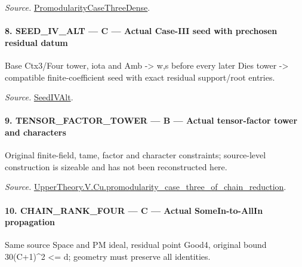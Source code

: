 \documentclass[11pt,a4paper]{article}
\numberwithin{equation}{section}
\theoremstyle{remark}\newtheorem{remark}[theorem]{Remark}
\begin{document}
\emph{Source.} \href{https://github.com/CocoSgt/riemann-hypothesis-lean/blob/7cbf7a0c32fca1badf05931879a37c3f8a2b03b4/src/Development/AutomorphicArithmetic/AutomorphicVarieties/ModularityArgument/ThresholdArguments/DenseThresholdCases/PromodularityCaseThree.lean#L40-L42}{PromodularityCaseThreeDense}.



\paragraph{8. SEED\_\allowbreak IV\_\allowbreak ALT — C — Actual Case-III seed with prechosen residual datum}

Base Ctx3/Four tower, iota and Amb -> w,s before every later Dies tower -> compatible finite-coefficient seed with exact residual support/root entries.

\emph{Source.} \href{https://github.com/CocoSgt/riemann-hypothesis-lean/blob/7cbf7a0c32fca1badf05931879a37c3f8a2b03b4/src/Development/AutomorphicArithmetic/AutomorphicVarieties/ModularityArgument/ThresholdArguments/DenseThresholdCases/PromodularityCaseThree.lean#L19-L25}{SeedIVAlt}.



\paragraph{9. TENSOR\_\allowbreak FACTOR\_\allowbreak TOWER — B — Actual tensor-factor tower and characters}

Original finite-field, tame, factor and character constraints; source-level construction is sizeable and has not been reconstructed here.

\emph{Source.} \href{https://github.com/CocoSgt/riemann-hypothesis-lean/blob/7cbf7a0c32fca1badf05931879a37c3f8a2b03b4/src/Development/AutomorphicArithmetic/AutomorphicVarieties/ModularityArgument/ThresholdArguments/DenseThresholdCases/PromodularityCaseThreeOfLemmas.lean#L131-L153}{UpperTheory.V.Cu.promodularity\_\allowbreak case\_\allowbreak three\_\allowbreak of\_\allowbreak chain\_\allowbreak reduction}.



\paragraph{10. CHAIN\_\allowbreak RANK\_\allowbreak FOUR — C — Actual SomeIn-to-AllIn propagation}

Same source Space and PM ideal, residual point Good4, original bound 30(C+1)\textasciicircum{}2 <= d; geometry must preserve all identities.
\end{document}

